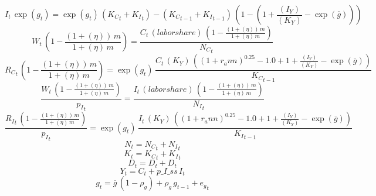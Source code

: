 \begin{dmath}
{{I}}_{t}\, \exp\left({{g}}_{t}\right)=\exp\left({{g}}_{t}\right)\, \left({{K_C}}_{t}+{{K_I}}_{t}\right)-\left({{K_C}}_{t-1}+{{K_I}}_{t-1}\right)\, \left(1-\left(1+\frac{{(I_Y)}}{{(K_Y)}}-\exp\left({{\overline{g}}}\right)\right)\right)
\end{dmath}
\begin{dmath}
{{W}}_{t}\, \left(1-\frac{\left(1+{(\eta)}\right)\, {{m}}}{1+{(\eta)}\, {{m}}}\right)=\frac{{{C}}_{t}\, {(labor share)}\, \left(1-\frac{\left(1+{(\eta)}\right)\, {{m}}}{1+{(\eta)}\, {{m}}}\right)}{{{N_C}}_{t}}
\end{dmath}
\begin{dmath}
{{R_C}}_{t}\, \left(1-\frac{\left(1+{(\eta)}\right)\, {{m}}}{1+{(\eta)}\, {{m}}}\right)=\exp\left({{g}}_{t}\right)\, \frac{{{C}}_{t}\, {(K_Y)}\, \left(\left(1+{{r_ann}}\right)^{0.25}-1.0+1+\frac{{(I_Y)}}{{(K_Y)}}-\exp\left({{\overline{g}}}\right)\right)}{{{K_C}}_{t-1}}
\end{dmath}
\begin{dmath}
\frac{{{W}}_{t}\, \left(1-\frac{\left(1+{(\eta)}\right)\, {{m}}}{1+{(\eta)}\, {{m}}}\right)}{{{p_I}}_{t}}=\frac{{{I}}_{t}\, {(labor share)}\, \left(1-\frac{\left(1+{(\eta)}\right)\, {{m}}}{1+{(\eta)}\, {{m}}}\right)}{{{N_I}}_{t}}
\end{dmath}
\begin{dmath}
\frac{{{R_I}}_{t}\, \left(1-\frac{\left(1+{(\eta)}\right)\, {{m}}}{1+{(\eta)}\, {{m}}}\right)}{{{p_I}}_{t}}=\exp\left({{g}}_{t}\right)\, \frac{{{I}}_{t}\, {(K_Y)}\, \left(\left(1+{{r_ann}}\right)^{0.25}-1.0+1+\frac{{(I_Y)}}{{(K_Y)}}-\exp\left({{\overline{g}}}\right)\right)}{{{K_I}}_{t-1}}
\end{dmath}
\begin{dmath}
{{N}}_{t}={{N_C}}_{t}+{{N_I}}_{t}
\end{dmath}
\begin{dmath}
{{K}}_{t}={{K_C}}_{t}+{{K_I}}_{t}
\end{dmath}
\begin{dmath}
{{D}}_{t}={{D}}_{t}+{{D}}_{t}
\end{dmath}
\begin{dmath}
{{Y}}_{t}={{C}}_{t}+{p\_I\_ss}\, {{I}}_{t}
\end{dmath}
\begin{dmath}
{{g}}_{t}={{\overline{g}}}\, \left(1-{{\rho_g}}\right)+{{\rho_g}}\, {{g}}_{t-1}+{{e_g}}_{t}
\end{dmath}
